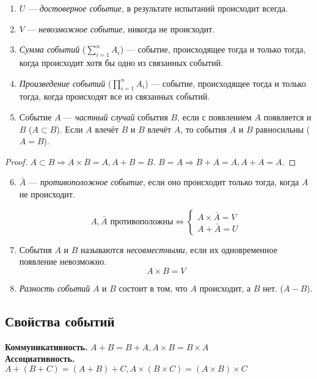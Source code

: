 \begin{enumerate}
	\item $U$ --- \textit{достоверное событие}, в результате испытаний происходит всегда.
	\item $V$ --- \textit{невозможное событие}, никогда не происходит.
	\item \textit{Сумма событий} ($\sum\limits_{i=1}^n A_i$) --- событие, происходящее тогда и только тогда, когда происходит хотя бы одно из связанных событий.
	\item \textit{Произведение событий} ($\prod\limits_{i=1}^n A_i$) --- событие, происходящее тогда и только тогда, когда происходят все из связанных событий.
	\item Событие $A$ --- \textit{частный случай} события $B$, если с появлением $A$ появляется и $B$ ($A \subset B$). Если $A$ влечёт $B$ и $B$ влечёт $A$, то события $A$ и $B$ равносильны ($A = B$).
\end{enumerate}
\begin{proof}
	$A \subset B \Rightarrow A\times B = A, A + B = B.$
	$B = A \Rightarrow B + A = A, A + A = A.$
\end{proof}
\begin{enumerate}
	\setcounter{enumi}{5}
	\item $\bar{A}$ --- \textit{противоположное событие}, если оно происходит только тогда, когда $A$ не происходит.

	      \[
		      A  ,  \bar{A} \text{ противоположны} \Leftrightarrow
		      \begin{cases}
			      A\times \bar{A} = V \\
			      A + \bar{A} = U
		      \end{cases}
	      \]

	\item События $A$ и $B$ называются \textit{несовместными}, если их одновременное появление невозможно.
	      $$A\times B = V$$

	\item \textit{Разность событий} $A$ и $B$ состоит в том, что $A$ происходит, а $B$ нет. ($A - B$).
\end{enumerate}

\subsection{Свойства событий}
\textbf{Коммуникативность.} $A + B = B + A, A\times B = B\times A$ \\

\textbf{Ассоциативность.} $A + (B + C)=(A + B) + C, A\times (B\times C) = (A\times B)\times C$ \\

